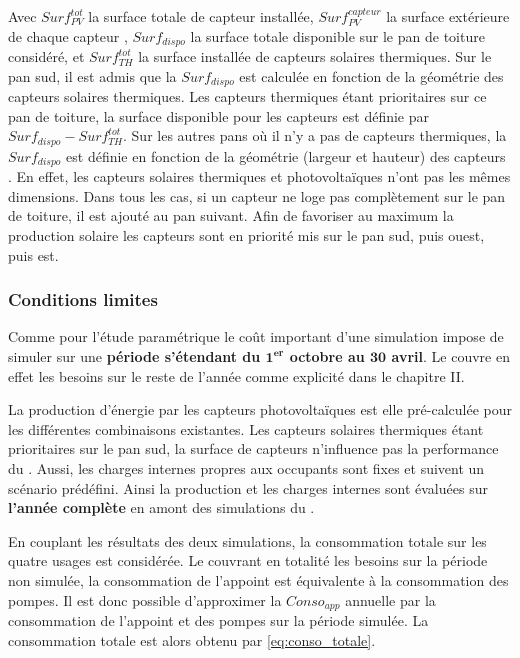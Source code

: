 Avec $Surf_{PV}^{tot}$ la surface totale de capteur  installée,
$Surf_{PV}^{capteur}$ la surface extérieure de chaque capteur , $Surf_{dispo}$ la
surface totale disponible sur le pan de toiture considéré, et $Surf_{TH}^{tot}$ la surface
installée de capteurs solaires thermiques. Sur le pan sud, il est admis que
la $Surf_{dispo}$ est calculée en fonction de la géométrie des capteurs solaires
thermiques. Les capteurs thermiques étant prioritaires sur ce pan de toiture, la surface
disponible pour les capteurs  est définie par $Surf_{dispo} - Surf_{TH}^{tot}$.
Sur les autres pans où il n’y a pas de capteurs thermiques, la $Surf_{dispo}$ est
définie en fonction de la géométrie (largeur et hauteur) des capteurs . En effet,
les capteurs solaires thermiques et photovoltaïques n’ont pas les mêmes dimensions.
Dans tous les cas, si un capteur ne loge pas complètement sur le pan de toiture,
il est ajouté au pan suivant. Afin de favoriser au maximum la production solaire
les capteurs sont en priorité mis sur le pan sud, puis ouest, puis est.


\subsubsection{Conditions limites} %
\label{ssub:conditions_limites}
Comme pour l’étude paramétrique le coût important d’une simulation impose de simuler
sur une \textbf{période s’étendant du $\bm{1^{er}}$ octobre au $\bm{30}$ avril}. Le 
couvre en effet les besoins sur le reste de l’année comme explicité dans le chapitre II.

La production d’énergie par les capteurs photovoltaïques est elle pré-calculée pour
les différentes combinaisons existantes. Les capteurs solaires thermiques
étant prioritaires sur le pan sud, la surface de capteurs  n’influence
pas la performance du . Aussi, les charges internes propres
aux occupants sont fixes et suivent un scénario prédéfini. Ainsi la production
 et les charges internes sont évaluées sur \textbf{l’année complète}
en amont des simulations du .

En couplant les résultats des deux simulations, la
consommation totale sur les quatre usages est considérée. Le  couvrant en totalité
les besoins sur la période non simulée, la consommation de l’appoint est équivalente à la
consommation des pompes. Il est donc possible d’approximer la $Conso_{app}$ annuelle par
la consommation de l’appoint et des pompes sur la période simulée. La consommation totale
est alors obtenu par \eqref{eq:conso_totale}.

